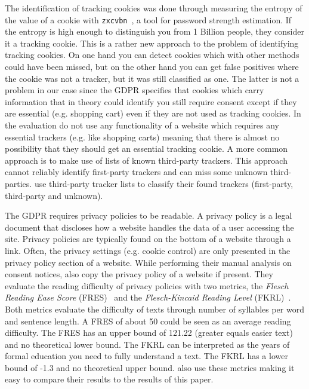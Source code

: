 The identification of tracking cookies was done through measuring the entropy of the value of a cookie with
\texttt{zxcvbn}~\cite{wheeler2016zxcvbn}, a tool for password strength estimation.
If the entropy is high enough to distinguish you from 1 Billion people, they
consider it a tracking cookie. This is a rather new approach to the problem of identifying tracking cookies.
On one hand you can detect cookies which with other methods could have been missed, but on the other hand you can get false positives
where the cookie was not a tracker, but it was still classified as one. The latter is not a problem in our case since the
GDPR specifies that cookies which carry information that in theory could identify you still require consent except if
they are essential (e.g. shopping cart) even if they are not used as tracking cookies. In the evaluation
\citeauthor{sanchez2019can} do not use any functionality of a
website which requires any essential trackers (e.g. like shopping carts) meaning that there is almost no possibility
that they should get an essential tracking cookie.
A more common approach is to make use of lists of known third-party trackers. This approach cannot reliably identify
first-party trackers and can miss some unknown third-parties. \citeauthor{sanchez2019can} use third-party tracker lists
to classify their found trackers (first-party, third-party and unknown).

The GDPR requires privacy policies to be readable. A privacy policy is a legal document that discloses how
a website handles the data of a user accessing the site. Privacy policies are typically found on the bottom
of a website through a link. Often, the privacy settings (e.g. cookie control) are only presented
in the privacy policy section of a website. While performing their manual analysis on consent notices,
\citeauthor{sanchez2019can} also copy the privacy policy of a website if present. They evaluate the reading difficulty of
privacy policies with
two metrics, the \emph{Flesch Reading Ease Score} (FRES)~\cite{flesch1948new} and the \emph{Flesch-Kincaid Reading
Level} (FKRL)~\cite{kincaid1975derivation}. Both metrics evaluate the difficulty of texts through number of syllables
per word and sentence length. A FRES of about 50 could be seen as an average reading difficulty. The FRES has an upper
bound of 121.22 (greater equals easier text) and no theoretical lower bound. The FKRL can be interpreted as the years of
formal education you need to fully understand a text. The FKRL has a lower bound of -1.3 and no
theoretical upper bound.  also use these metrics making it easy to compare their results to the
results of this paper.

